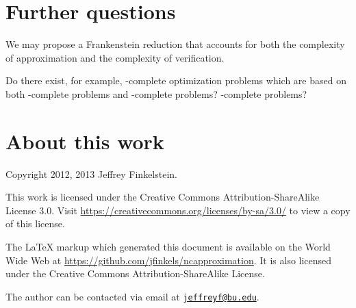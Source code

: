 \documentclass[]{article}
\newcommand{\email}[1]{\href{mailto:#1}{\nolinkurl{#1}}}
\begin{document}
\section{Further questions}

\begin{todo}
  We may propose a Frankenstein reduction that accounts for both the complexity of approximation and the complexity of verification.
\end{todo}

\begin{todo}
  Do there exist, for example, \ApxPO-complete optimization problems which are based on both \NP-complete problems and \PSPACE-complete problems?
  \STP-complete problems?
\end{todo}

\section{About this work}

Copyright 2012, 2013 Jef{}frey Finkelstein.

This work is licensed under the Creative Commons Attribution-ShareAlike License 3.0.
Visit \mbox{\url{https://creativecommons.org/licenses/by-sa/3.0/}} to view a copy of this license.

The \LaTeX{} markup which generated this document is available on the World Wide Web at \mbox{\url{https://github.com/jfinkels/ncapproximation}}.
It is also licensed under the Creative Commons Attribution-ShareAlike License.

The author can be contacted via email at \email{jeffreyf@bu.edu}.



\end{document}
